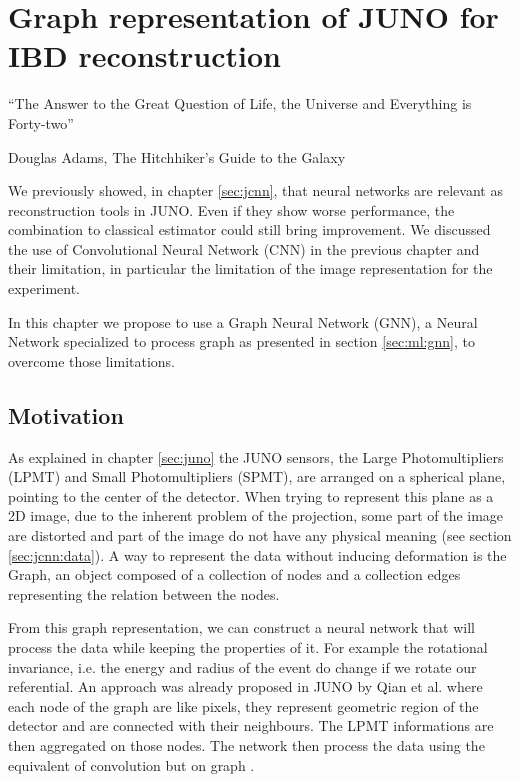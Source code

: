 \documentclass[../main.tex]{subfiles}
\begin{document}
\chapter{Graph representation of JUNO for IBD reconstruction}
\epigraph{``The Answer to the Great Question of Life, the Universe and Everything is Forty-two''}{Douglas Adams, The Hitchhiker’s Guide to the Galaxy}
\label{sec:jgnn}

We previously showed, in chapter \ref{sec:jcnn}, that neural networks are relevant as reconstruction tools in JUNO. Even if they show worse performance, the combination to classical estimator could still bring improvement. We discussed the use of Convolutional Neural Network (CNN) in the previous chapter and their limitation, in particular the limitation of the image representation for the experiment.

In this chapter we propose to use a Graph Neural Network (GNN), a Neural Network specialized to process graph as presented in section \ref{sec:ml:gnn}, to overcome those limitations.

\section{Motivation}
\label{sec:jgnn:motiv}

As explained in chapter \ref{sec:juno} the JUNO sensors, the Large Photomultipliers (LPMT) and Small Photomultipliers (SPMT), are arranged on a spherical plane, pointing to the center of the detector. When trying to represent this plane as a 2D image, due to the inherent problem of the projection, some part of the image are distorted and part of the image do not have any physical meaning (see section  \ref{sec:jcnn:data}). A way to represent the data without inducing deformation is the Graph, an object composed of a collection of nodes and a collection edges representing the relation between the nodes.

From this graph representation, we can construct a neural network that will process the data while keeping the properties of it. For example the rotational invariance, i.e. the energy and radius of the event do change if we rotate our referential. An approach was already proposed in JUNO by Qian et al. \cite{qian_vertex_2021} where each node of the graph are like pixels, they represent geometric region of the detector and are connected with their neighbours. The LPMT informations are then aggregated on those nodes. The network then process the data using the equivalent of convolution but on graph \cite{defferrard_convolutional_2017}.
\end{document}
